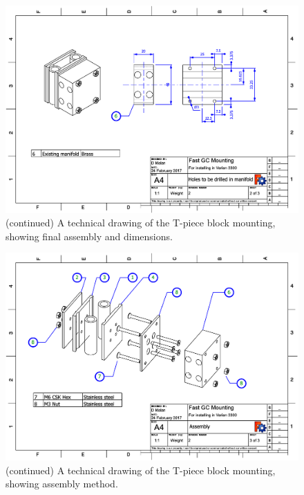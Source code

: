 \begin{figure}
	\ContinuedFloat
	\centering
	\includegraphics[angle=90, origin=c, scale=0.75]{Figures/CarDrawing2.pdf}
	\decoRule	
	
	\caption[]{(continued) A technical drawing of the T-piece block mounting,
	showing final assembly and dimensions.}
	
\end{figure}

\begin{figure}
	\ContinuedFloat
	\centering
	\includegraphics[angle=90, origin=c, scale=0.75]{Figures/CarDrawing3.pdf}
	\decoRule	
	
	\caption[]{(continued) A technical drawing of the T-piece block mounting, showing assembly method.} 
	
\end{figure}


